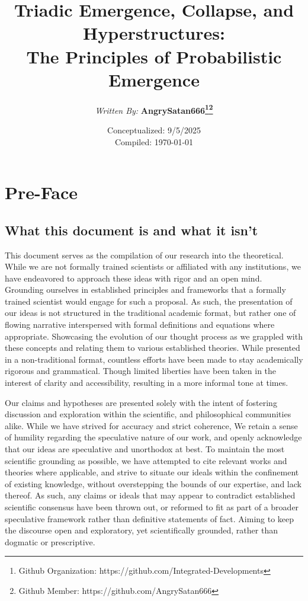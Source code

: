 \documentclass[11pt]{article}
\title{{\Large\bfseries\color{primaryblue}Triadic Emergence, Collapse, and Hyperstructures:}\\
{\large\bfseries\color{darkgray}The Principles of Probabilistic Emergence}}
\author[1]{\emph{\hspace{2em}Written By: } \newline\bfseries{AngrySatan666}\thanks{Github Organization: https://github.com/Integrated-Developments}\thanks{Github Member: https://github.com/AngrySatan666}}
\affil{\small Independent Researchers of \emph{\bfseries{Integrated-Developments}}}
\date{Conceptualized: 9/5/2025 \\ Compiled: \today}
\newcommand{\headertext}{}
\begin{document}
\maketitle
    \thispagestyle{empty}
\newpage

\tableofcontents
    \renewcommand{\headertext}{(TECH: PoPE) Triadic Emergence, Collapse, and Hyperstructures: \\ \hspace*{3em}The Principles of Probabilistic Emergence}
\newpage

\section{Pre-Face}
    \renewcommand{\headertext}{(TECH: PoPE)\hspace{1em} SS-1: \hspace{1em}Pre-Face}
    \subsection{What this document is and what it isn't}
        \hspace{1em}
        This document serves as the compilation of our research into the theoretical.
        While we are not formally trained scientists or affiliated with any institutions,
        we have endeavored to approach these ideas with rigor and an open mind.
        Grounding ourselves in established principles and frameworks that a formally trained scientist would engage for such a proposal.
        As such, the presentation of our ideas is not structured in the traditional academic format,
        but rather one of flowing narrative interspersed with formal definitions and equations where appropriate.
        Showcasing the evolution of our thought process as we grappled with these concepts and relating them to various established theories.
        While presented in a non-traditional format, countless efforts have been made to stay academically rigorous and grammatical.
        Though limited liberties have been taken in the interest of clarity and accessibility, resulting in a more informal tone at times.

        Our claims and hypotheses are presented solely with the intent of fostering discussion and exploration within the scientific, and philosophical communities alike.
        While we have strived for accuracy and strict coherence, We retain a sense of humility regarding the speculative nature of our work, and openly acknowledge that our ideas are speculative and unorthodox at best.
        To maintain the most scientific grounding as possible, we have attempted to cite relevant works and theories where applicable, and strive to situate our ideals within the confinement of existing knowledge, without overstepping the bounds of our expertise, and lack thereof.
        As such, any claims or ideals that may appear to contradict established scientific consensus have been thrown out, or reformed to fit as part of a broader speculative framework rather than definitive statements of fact.
        Aiming to keep the discourse open and exploratory, yet scientifically grounded, rather than dogmatic or prescriptive.
\end{document}
